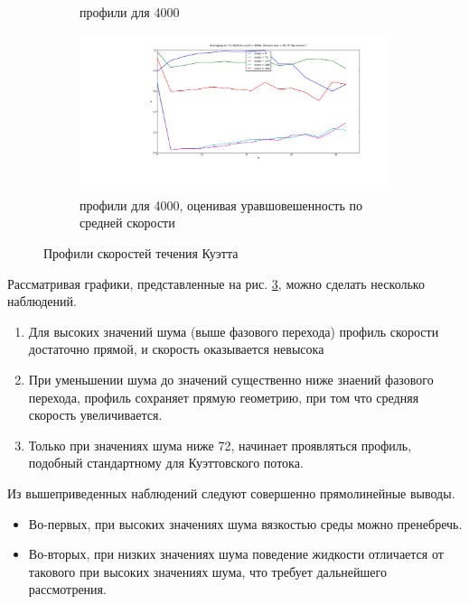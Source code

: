 \begin{figure}
\begin{subfigure}{0.45\textwidth}
                \caption{профили для 4000}
                \label{fig:Results:4kNew}
        \end{subfigure}
        \begin{subfigure}{0.45\textwidth}
                \includegraphics[width=\textwidth]{4k_slices_oldAlg}
                \caption{профили для 4000, оценивая уравшовешенность по средней скорости}
                \label{fig:Results:4kOld}
        \end{subfigure}
        \caption{Профили скоростей течения Куэтта}
        \label{fig:Results}
        \end{figure}

        Рассматривая графики, представленные на рис. \ref{fig:Results}, можно сделать несколько наблюдений.
        \begin{enumerate}
            \item Для высоких значений шума (выше фазового перехода) профиль скорости достаточно прямой, и скорость оказывается невысока
            \item При уменьшении шума до значений существенно ниже знаений фазового перехода, профиль сохраняет прямую геометрию, при том что средняя скорость увеличивается.
            \item Только при значениях шума ниже 72, начинает проявляться профиль, подобный стандартному для Куэттовского потока.
        \end{enumerate}

        Из вышеприведенных наблюдений следуют совершенно прямолинейные выводы.



        \begin{itemize}
            \item Во-первых, при высоких значениях шума вязкостью среды можно пренебречь.
            \item Во-вторых, при низких значениях шума поведение жидкости отличается от такового при высоких значениях шума, что требует дальнейшего рассмотрения. 
        \end{itemize}

